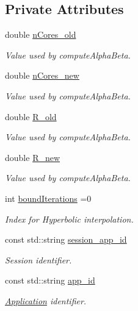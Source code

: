 \subsection*{Private Attributes}
\begin{DoxyCompactItemize}
\item 
double \hyperlink{classApplication_a425bb14c5264f07d9eafa6f9caa6a8b1}{n\-Cores\-\_\-old}
\begin{DoxyCompactList}\small\item\em Value used by compute\-Alpha\-Beta. \end{DoxyCompactList}\item 
double \hyperlink{classApplication_af7b37c07da0fefef4d86ed3c567b08d2}{n\-Cores\-\_\-new}
\begin{DoxyCompactList}\small\item\em Value used by compute\-Alpha\-Beta. \end{DoxyCompactList}\item 
double \hyperlink{classApplication_a950cfc8da4a8e4640aee8d2840f53e0e}{R\-\_\-old}
\begin{DoxyCompactList}\small\item\em Value used by compute\-Alpha\-Beta. \end{DoxyCompactList}\item 
double \hyperlink{classApplication_a9e94824741ac0c52d0fa5ede30c72fa1}{R\-\_\-new}
\begin{DoxyCompactList}\small\item\em Value used by compute\-Alpha\-Beta. \end{DoxyCompactList}\item 
int \hyperlink{classApplication_a6a3692743eccba602a58fdfc3f23950b}{bound\-Iterations} =0
\begin{DoxyCompactList}\small\item\em Index for Hyperbolic interpolation. \end{DoxyCompactList}\item 
const std\-::string \hyperlink{classApplication_a6152c40564d526b9b60871c98f7a51c7}{session\-\_\-app\-\_\-id}
\begin{DoxyCompactList}\small\item\em Session identifier. \end{DoxyCompactList}\item 
const std\-::string \hyperlink{classApplication_a5cedee59cfd3cbf89d02174e2f521493}{app\-\_\-id}
\begin{DoxyCompactList}\small\item\em \hyperlink{classApplication}{Application} identifier. \end{DoxyCompactList}\item 

\end{DoxyCompactItemize}
